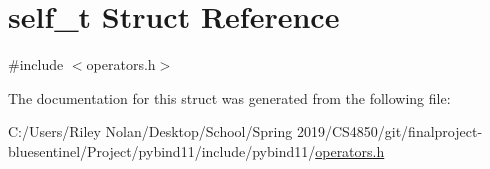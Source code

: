 \hypertarget{structself__t}{}\section{self\+\_\+t Struct Reference}
\label{structself__t}


{\ttfamily \#include $<$operators.\+h$>$}



The documentation for this struct was generated from the following file\+:\begin{DoxyCompactItemize}
\item 
C\+:/\+Users/\+Riley Nolan/\+Desktop/\+School/\+Spring 2019/\+C\+S4850/git/finalproject-\/bluesentinel/\+Project/pybind11/include/pybind11/\mbox{\hyperlink{operators_8h}{operators.\+h}}\end{DoxyCompactItemize}
